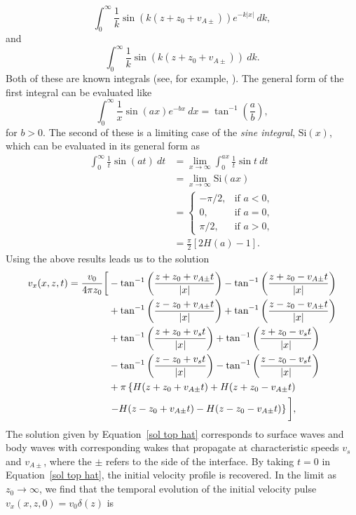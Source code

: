 \documentclass[12pt]{../style-files/ociamthesis}
\begin{document}
\begin{equation}
\int_{0}^{\infty} \frac{1}{k}\sin(k(z + z_0 + v_{A\pm}))e^{-k|x|} ~dk,
\end{equation}
and
\begin{equation}
\int_{0}^{\infty} \frac{1}{k}\sin(k(z + z_0 + v_{A\pm})) ~dk.
\end{equation}
Both of these are known integrals (see, for example, \citealp{abr_etal65}). The general form of the first integral can be evaluated like
\begin{equation}
\int_{0}^{\infty} \frac{1}{x}\sin(ax) e^{-bx} ~dx = \tan^{-1}\left(\frac{a}{b}\right),
\end{equation}
for $b > 0$. The second of these is a limiting case of the \textit{sine integral}, $\mathrm{Si}(x)$, which can be evaluated in its general form as
\begin{align}
\int_{0}^{\infty} \frac{1}{t}\sin(at) ~dt &= \lim_{x \to \infty}\int_{0}^{ax} \frac{1}{t}\sin{t} ~dt \\
&= \lim_{x \to \infty} \mathrm{Si}(ax)  \\
&=
\begin{cases}
-\pi/2, &\text{if  } a < 0, \\
0, &\text{if  } a = 0, \\
\pi/2, &\text{if  } a > 0,
\end{cases} \\
&= \frac{\pi}{2} \left[2H(a) - 1\right].
\end{align}
Using the above results leads us to the solution
\begin{align}
v_x(x, z, t) = \frac{v_0}{4\pi z_0} \bigg[ &-\tan^{-1}\left( \frac{z + z_0 + v_{A\pm}t}{|x|} \right) - \tan^{-1}\left( \frac{z + z_0 - v_{A\pm}t}{|x|} \right)  \notag \\
&+ \tan^{-1}\left( \frac{z - z_0 + v_{A\pm}t}{|x|} \right) + \tan^{-1}\left( \frac{z - z_0 - v_{A\pm}t}{|x|} \right) \notag \\
&+ \tan^{-1}\left( \frac{z + z_0 + v_st}{|x|} \right) + \tan^{-1}\left( \frac{z + z_0 - v_st}{|x|} \right) \notag \\
&- \tan^{-1}\left( \frac{z - z_0 + v_st}{|x|} \right) - \tan^{-1}\left( \frac{z - z_0 - v_st}{|x|} \right) \notag \\
&+ \pi \left\{ H(z + z_0 + v_{A\pm}t) + H(z + z_0 - v_{A\pm}t) \right.  \notag \\
&\left. - H(z - z_0 + v_{A\pm}t) - H(z - z_0 - v_{A\pm}t) \right\} \bigg], \label{sol top hat}
\end{align}
The solution given by Equation~\eqref{sol top hat} corresponds to surface waves and body waves with corresponding wakes that propagate at characteristic speeds $v_s$ and $v_{A\pm}$, where the $\pm$ refers to the side of the interface. By taking $t = 0$ in Equation~\eqref{sol top hat}, the initial velocity profile is recovered. In the limit as $z_0 \to \infty$, we find that the temporal evolution of the initial velocity pulse $v_x(x, z, 0) = v_0 \delta(z)$ is
\end{document}
